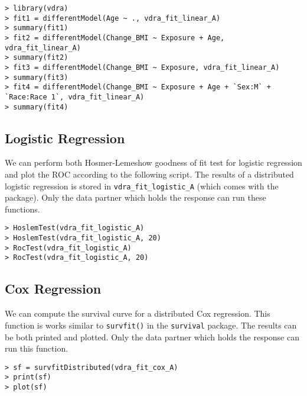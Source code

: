 \documentclass[12]{article}
\begin{document}
\begin{verbatim}
> library(vdra)
> fit1 = differentModel(Age ~ ., vdra_fit_linear_A)
> summary(fit1)
> fit2 = differentModel(Change_BMI ~ Exposure + Age, vdra_fit_linear_A)
> summary(fit2)
> fit3 = differentModel(Change_BMI ~ Exposure, vdra_fit_linear_A)
> summary(fit3)
> fit4 = differentModel(Change_BMI ~ Exposure + Age + `Sex:M` + `Race:Race 1`, vdra_fit_linear_A)
> summary(fit4)
\end{verbatim}


\subsection{Logistic Regression}

We can perform both Hosmer-Lemeshow goodness of fit test for logistic regression and plot the ROC according to the following script.  The results of a distributed logistic regression is stored in \verb"vdra_fit_logistic_A" (which comes with the package).  Only the data partner which holds the response can run these functions.

\begin{verbatim}
> HoslemTest(vdra_fit_logistic_A)
> HoslemTest(vdra_fit_logistic_A, 20)
> RocTest(vdra_fit_logistic_A)
> RocTest(vdra_fit_logistic_A, 20)
\end{verbatim}

\subsection{Cox Regression}

We can compute the survival curve for a distributed Cox regression.  This function is works similar to \verb"survfit()" in the \verb"survival" package.  The results can be both printed and plotted.  Only the data partner which holds the response can run this function.

\begin{verbatim}
> sf = survfitDistributed(vdra_fit_cox_A)
> print(sf)
> plot(sf)
\end{verbatim}
\end{document}

